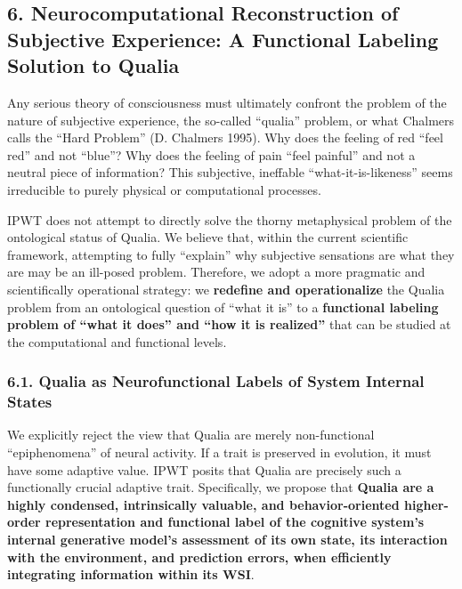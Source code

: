 \documentclass[
  a4paper]{article}
\begin{document}
\subsection{6. Neurocomputational Reconstruction of Subjective
Experience: A Functional Labeling Solution to
Qualia}\label{neurocomputational-reconstruction-of-subjective-experience-a-functional-labeling-solution-to-qualia}

Any serious theory of consciousness must ultimately confront the problem
of the nature of subjective experience, the so-called ``qualia''
problem, or what Chalmers calls the ``Hard Problem'' (D. Chalmers 1995).
Why does the feeling of red ``feel red'' and not ``blue''? Why does the
feeling of pain ``feel painful'' and not a neutral piece of information?
This subjective, ineffable ``what-it-is-likeness'' seems irreducible to
purely physical or computational processes.

IPWT does not attempt to directly solve the thorny metaphysical problem
of the ontological status of Qualia. We believe that, within the current
scientific framework, attempting to fully ``explain'' why subjective
sensations are what they are may be an ill-posed problem. Therefore, we
adopt a more pragmatic and scientifically operational strategy: we
\textbf{redefine and operationalize} the Qualia problem from an
ontological question of ``what it is'' to a \textbf{functional labeling
problem of ``what it does'' and ``how it is realized''} that can be
studied at the computational and functional levels.

\subsubsection{6.1. Qualia as Neurofunctional Labels of System Internal
States}\label{qualia-as-neurofunctional-labels-of-system-internal-states}

We explicitly reject the view that Qualia are merely non-functional
``epiphenomena'' of neural activity. If a trait is preserved in
evolution, it must have some adaptive value. IPWT posits that Qualia are
precisely such a functionally crucial adaptive trait. Specifically, we
propose that \textbf{Qualia are a highly condensed, intrinsically
valuable, and behavior-oriented higher-order representation and
functional label of the cognitive system's internal generative model's
assessment of its own state, its interaction with the environment, and
prediction errors, when efficiently integrating information within its
WSI}.
\end{document}

